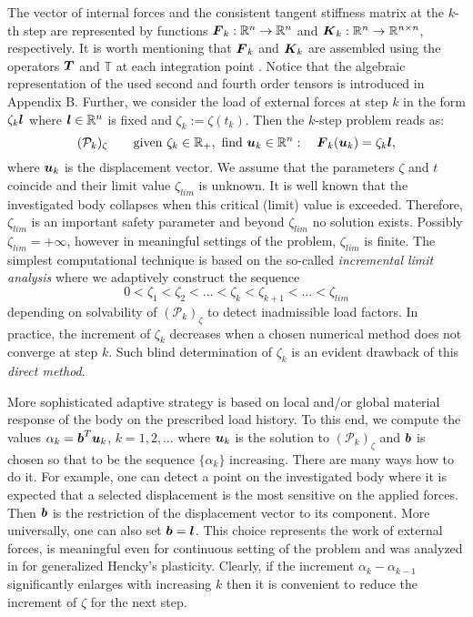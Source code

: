 \documentclass[a4paper,12pt]{article}
\theoremstyle{remark}
\newcommand{\mbf}[1]{\mbox{\boldmath$#1$}}
\numberwithin{equation}{section}
\begin{document}
The vector of  internal forces and the consistent tangent stiffness matrix at the $k$-th step are represented by functions $\mbf F_k:\mathbb R^n\rightarrow\mathbb R^n$ and $\mbf K_k:\mathbb R^n\rightarrow\mathbb R^{n\times n}$, respectively. It is worth mentioning that $\mbf F_k$ and $\mbf K_k$ are assembled using the operators $\mbf T$ and $\mathbb T$ at each integration point \cite{SCKKZB15}. Notice that the algebraic representation of the used second and fourth order tensors is introduced in Appendix B. Further, we consider the load of external forces at step $k$ in the form $\zeta_k\mbf l$ where $\mbf l\in\mathbb R^n$ is fixed and $\zeta_k:=\zeta(t_k)$. Then the $k$-step problem reads as:
$$(\mathcal P_k)_\zeta \qquad\mbox{given }\zeta_{k}\in\mathbb R_+, \mbox{ find } \mbf u_{k}\in\mathbb R^n:\quad \mbf{F}_{k}(\mbf{u}_{k})=\zeta_{k}\mbf{l},$$ 
where $\mbf u_k$ is the displacement vector.
We assume that the parameters $\zeta$ and $t$ coincide and their limit value $\zeta_{lim}$ is unknown. It is well known that the investigated body collapses when this critical (limit) value is exceeded. Therefore, $\zeta_{lim}$ is an important safety parameter and beyond $\zeta_{lim}$ no solution exists. Possibly $\zeta_{lim}=+\infty$, however in meaningful settings of the problem, $\zeta_{lim}$ is finite. The simplest computational technique is based on the so-called {\it incremental limit analysis} where we adaptively construct the sequence
$$0<\zeta_1<\zeta_2<\ldots<\zeta_{k}<\zeta_{k+1}<\ldots<\zeta_{lim}$$ 
depending on solvability of $(\mathcal P_k)_\zeta$ to detect inadmissible load factors. In practice, the increment of $\zeta_k$ decreases when a chosen numerical method does not converge at step $k$. Such blind determination of $\zeta_k$ is an evident drawback of this {\it direct method}.

More sophisticated adaptive strategy  is based on local and/or global material response of the body on the prescribed load history. To this end, we compute the values $\alpha_k=\mbf b^T\mbf u_k$, $k=1,2,\ldots$ where $\mbf u_k$ is the solution to $(\mathcal P_k)_\zeta$ and $\mbf b$ is chosen so that to be the sequence $\{\alpha_k\}$ increasing. There are many ways how to do it. For example, one can detect a point on the investigated body where it is expected that a selected displacement is the most sensitive on the applied forces. Then $\mbf b$ is the restriction of the displacement vector to its component. More universally, one can also set $\mbf b=\mbf l$. This choice represents the work of external forces, is meaningful even for continuous setting of the problem and was analyzed in \cite{SHHC15, CHKS15, HRS16, HRS16b} for generalized Hencky's plasticity. Clearly, if the increment $\alpha_k-\alpha_{k-1}$ significantly enlarges with increasing $k$ then it is convenient to reduce the increment of $\zeta$ for the next step.
\end{document}
